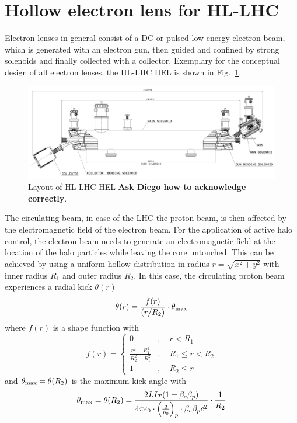 \documentclass[%
 reprint,
 amsmath,amssymb,
 aps,
prstab,
]{revtex4-1}
\begin{document}
\section{\label{sec:hel}Hollow electron lens for HL-LHC}
Electron lenses in general consist of a DC or pulsed low energy electron beam, which is generated with an electron gun, then guided and confined by strong solenoids and finally collected with a collector. Exemplary for the conceptual design of all electron lenses, the HL-LHC HEL is shown in Fig.~\ref{fig:hel_layout}.
\begin{figure}[h]
	\includegraphics[width=1.0\linewidth]{hel_layout}%
	\caption{\label{fig:hel_layout} Layout of HL-LHC HEL \textbf{Ask Diego how to acknowledge correctly}.}
\end{figure}
The circulating beam, in case of the LHC the proton beam, is then affected by the electromagnetic field of the electron beam. For the application of active halo control, the electron beam needs to generate an electromagnetic field at the location of the halo particles while leaving the core untouched. This can be achieved by using a uniform hollow distribution in radius $r=\sqrt{x^2+y^2}$ with inner radius $R_1$ and outer radius $R_2$. In this case, the circulating proton beam experiences a radial kick $\theta(r)$
\begin{equation}\label{eq:field_1}
\theta(r)=\frac{f(r)}{(r/R_2)}\cdot \theta_{\rm max}
\end{equation}
where $f(r)$ is a shape function with
\begin{equation}\label{eq:field_2}
f(r) =
\begin{cases} 0 &,\quad r< R_1\\
\frac{r^2-R_1^2}{R_2^2-R_1^2} &,\quad R_1 \leq r < R_2\\
1 &,\quad R_2 \leq r
\end{cases}
\end{equation}
and $\theta_{\rm max}=\theta(R_2)$ is the maximum kick angle with
\begin{equation}
\theta_{\rm max} = \theta(R_2) = \frac{2LI_T(1\pm\beta_e\beta_p)}{4\pi\epsilon_0  \cdot \left(\frac{q}{p_0}\right)_p \cdot \beta_e\beta_p c^2}\cdot\frac{1}{R_2}
\end{equation}
\end{document}
